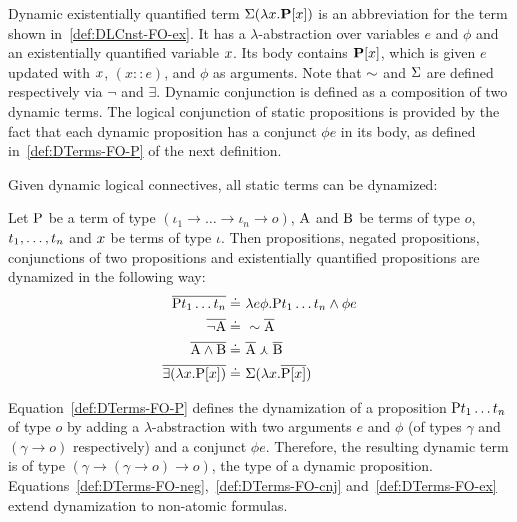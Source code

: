 Dynamic existentially quantified term $\ex2 ( \lambda \x1. \P2[\x1]) $ is an abbreviation for the term shown in~\eqref{def:DLCnst-FO-ex}. It has a $\lambda$-abstraction over variables $e$ and $\phi$ and an existentially quantified variable $\x1$. Its body contains $\P2[\x1]$, which is given $e$ updated with $\x1$, $(x::e)$, and $\phi$ as arguments.  Note that $\n2$ and $\ex2$ are defined respectively via $\neg$ and $\exists$.
Dynamic conjunction is defined as a composition of two dynamic terms. The logical conjunction of static propositions is provided by the fact that each dynamic proposition has a conjunct $\phi e $ in its body, as defined in~\eqref{def:DTerms-FO-P} of the next definition.

 Given dynamic logical connectives, all static terms can be dynamized:
\begin{definition}\label{def:DTerms-FO} Let $\P1$ be a term of type $(\iota_1 \rightarrow \dots \rightarrow \iota_n \rightarrow o)$, $\A1$ and $\B1$ be terms of type $o$, $\t1_1, \dots, \t1_n$ and $\x1$ be terms of type $\iota$. Then propositions, negated propositions, conjunctions of two propositions and existentially quantified propositions are dynamized in the following way:
\begin{subequations}
\begin{align}
\tr{ \P1 \t1_1 \dots \t1_n } \defeq \ & \lambda e \phi . \P1 \t1_1 \dots \t1_n \land \phi e  \label{def:DTerms-FO-P}\\
\tr{ \neg \A1  } \defeq \ & \n2 \tr{\A1}  \label{def:DTerms-FO-neg}\\
\tr{ \A1 \land \B1} \defeq \ & \tr{\A1} \cnj2 \tr{\B1}  \label{def:DTerms-FO-cnj}\\
\tr{\exists( \lambda \x1. \P1 [\x1])} \defeq \ & \ex2( \lambda  \x1. \tr{\P1 [\x1]})  \label{def:DTerms-FO-ex}
\end{align}
\end{subequations}
\end{definition}
Equation~\eqref{def:DTerms-FO-P} defines the dynamization of a proposition $\P1 \t1_1 \dots \t1_n $ of type $o$ by adding a $\lambda$-abstraction with two arguments  $e$ and $\phi$  (of types $\gamma$ and $(\gamma \rightarrow o)$ respectively) and a conjunct $\phi e$. Therefore, the resulting dynamic term is of type $(\gamma \rightarrow (\gamma \rightarrow o) \rightarrow o )$, the type of a dynamic proposition. Equations~\ref{def:DTerms-FO-neg},~\ref{def:DTerms-FO-cnj} and~\ref{def:DTerms-FO-ex} extend dynamization to non-atomic formulas.

